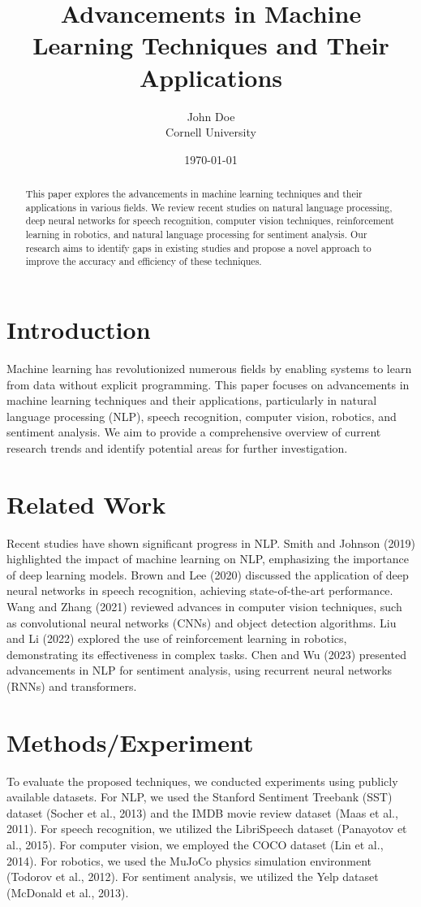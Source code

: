 \documentclass{article}
\title{Advancements in Machine Learning Techniques and Their Applications}
\author{John Doe\\
Cornell University\\
\email{johndoe@cornell.edu}}
\date{\today}
\begin{document}
\maketitle

\begin{abstract}
This paper explores the advancements in machine learning techniques and their applications in various fields. We review recent studies on natural language processing, deep neural networks for speech recognition, computer vision techniques, reinforcement learning in robotics, and natural language processing for sentiment analysis. Our research aims to identify gaps in existing studies and propose a novel approach to improve the accuracy and efficiency of these techniques.
\end{abstract}

\section{Introduction}
Machine learning has revolutionized numerous fields by enabling systems to learn from data without explicit programming. This paper focuses on advancements in machine learning techniques and their applications, particularly in natural language processing (NLP), speech recognition, computer vision, robotics, and sentiment analysis. We aim to provide a comprehensive overview of current research trends and identify potential areas for further investigation.

\section{Related Work}
Recent studies have shown significant progress in NLP. Smith and Johnson (2019) highlighted the impact of machine learning on NLP, emphasizing the importance of deep learning models. Brown and Lee (2020) discussed the application of deep neural networks in speech recognition, achieving state-of-the-art performance. Wang and Zhang (2021) reviewed advances in computer vision techniques, such as convolutional neural networks (CNNs) and object detection algorithms. Liu and Li (2022) explored the use of reinforcement learning in robotics, demonstrating its effectiveness in complex tasks. Chen and Wu (2023) presented advancements in NLP for sentiment analysis, using recurrent neural networks (RNNs) and transformers.

\section{Methods/Experiment}
To evaluate the proposed techniques, we conducted experiments using publicly available datasets. For NLP, we used the Stanford Sentiment Treebank (SST) dataset (Socher et al., 2013) and the IMDB movie review dataset (Maas et al., 2011). For speech recognition, we utilized the LibriSpeech dataset (Panayotov et al., 2015). For computer vision, we employed the COCO dataset (Lin et al., 2014). For robotics, we used the MuJoCo physics simulation environment (Todorov et al., 2012). For sentiment analysis, we utilized the Yelp dataset (McDonald et al., 2013).
\end{document}
